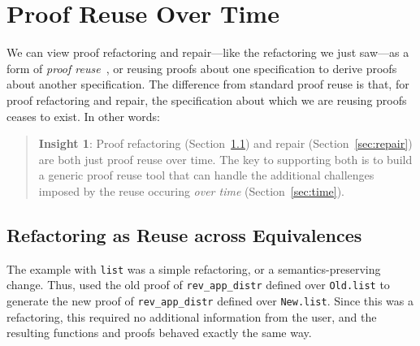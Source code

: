 \section{Proof Reuse Over Time}
\label{sec:key1}

We can view proof refactoring and repair---like the refactoring we just saw---as a form of 
\textit{proof reuse}~\cite{Ringer2019, felty1994generalization, caplan1995logical, pons2000generalization, johnsen2004theorem}, %
or reusing proofs about one specification to derive proofs about another specification.
The difference from standard proof reuse is that, for proof refactoring and repair, the specification about which
we are reusing proofs ceases to exist. In other words:

\begin{quote}
\textbf{Insight 1}:
Proof refactoring (Section~\ref{sec:refactoring}) and repair (Section~\ref{sec:repair}) are both just 
proof reuse %
over time. The key to supporting both is to build a generic proof reuse
tool that can handle the additional challenges imposed by the reuse occuring \textit{over time} (Section~\ref{sec:time}). 
\end{quote}

\subsection{Refactoring as Reuse across Equivalences}
\label{sec:refactoring}

The example with \lstinline{list} was a simple refactoring, or a semantics-preserving change.
Thus, \toolname used the old proof of \lstinline{rev_app_distr} defined over \lstinline{Old.list}
to generate the new proof of \lstinline{rev_app_distr} defined over \lstinline{New.list}.
Since this was a refactoring, this required no additional information from the user, and the resulting functions
and proofs behaved exactly the same way.

